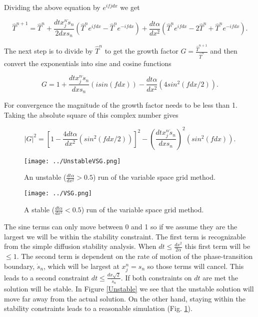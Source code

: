 \documentclass[12pt]{article}
\begin{document}
Dividing the above equation by $e^{ifjdx}$ we get

\begin{equation}
\hat{T}^{n+1} = \hat{T}^{n} + \frac{dt x_j^n \dot{s}_n}{2dx s_n}
(\hat{T}^{n}e^{ifdx}-\hat{T}^{n}e^{-ifdx}) + \frac{dt\alpha}{dx^2} (\hat{T}^{n}e^{ifdx} - 2\hat{T}^{n} + \hat{T}^{n}e^{-ifdx}).
\end{equation}

The next step is to divide by $\hat{T}^n$ to get the growth factor $G = \frac{\hat{T}^{n+1}}{\hat{T}^n}$ and then convert the exponentials into sine and cosine functions

\begin{equation}
G = 1 + \frac{dt x_j^n \dot{s}_n}{dx s_n}
(isin(fdx)) - \frac{dt\alpha}{dx^2} (4sin^2(fdx/2)).
\end{equation}

For convergence the magnitude of the growth factor needs to be less than 1. Taking the absolute square of this complex number gives

\begin{equation}
|G|^2 = \left[ 1 - \frac{4dt\alpha}{dx^2}(sin^2(fdx/2)) \right]^2 - \left( \frac{dt x_j^n \dot{s}_n}{dx s_n}\right)^2 (sin^2(fdx)).
\end{equation}

\begin{figure}[!b]
\centering
{}
  \texttt{[image: ../UnstableVSG.png]}
  \caption{An unstable ($\frac{dt\alpha}{dx^2}>0.5$) run of the variable space grid method.}
  \label{Unstable}
\endminipage
\hfill
{}
  \texttt{[image: ../VSG.png]}
  \caption{A stable ($\frac{dt\alpha}{dx^2}<0.5$) run of the variable space grid method.}
  \label{Stable}
\endminipage
\end{figure}

The sine terms can only move between 0 and 1 so if we assume they are the largest we will be within the stability constraint. The first term is recognizable from the simple diffusion stability analysis. When $dt \leq \frac{dx^2}{2\alpha}$ this first term will be $\leq 1$. The second term is dependent on the rate of motion of the phase-transition boundary, $\dot{s}_n$, which will be largest at $x_j^n = s_n$ so those terms will cancel. This leads to a second constraint $dt \leq \frac{dx \sqrt{2}}{\dot{s}_n}$. If both constraints on $dt$ are met the solution will be stable. In Figure \ref{Unstable} we see that the unstable solution will move far away from the actual solution. On the other hand, staying within the stability constraints leads to a reasonable simulation (Fig. \ref{Stable}).
\end{document}
